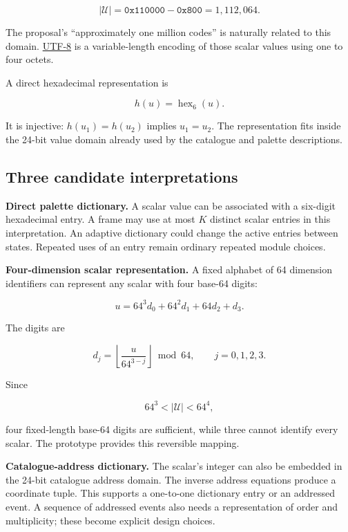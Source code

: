 \documentclass[
  11pt,
  a4paper,
]{article}
\begin{document}
\[
|\mathcal U|=
\mathtt{0x110000}-\mathtt{0x800}
=1{,}112{,}064.
\]

The proposal's ``approximately one million codes'' is naturally related
to this domain.
\href{https://www.rfc-editor.org/rfc/rfc3629.html}{UTF-8} is a
variable-length encoding of those scalar values using one to four
octets.

A direct hexadecimal representation is

\[
h(u)=\operatorname{hex}_6(u).
\]

It is injective: \(h(u_1)=h(u_2)\) implies \(u_1=u_2\). The
representation fits inside the 24-bit value domain already used by the
catalogue and palette descriptions.

\hypertarget{three-candidate-interpretations}{%
\subsection{Three candidate
interpretations}\label{three-candidate-interpretations}}

\textbf{Direct palette dictionary.} A scalar value can be associated
with a six-digit hexadecimal entry. A frame may use at most \(K\)
distinct scalar entries in this interpretation. An adaptive dictionary
could change the active entries between states. Repeated uses of an
entry remain ordinary repeated module choices.

\textbf{Four-dimension scalar representation.} A fixed alphabet of 64
dimension identifiers can represent any scalar with four base-64 digits:

\[
u=64^3d_0+64^2d_1+64d_2+d_3.
\]

The digits are

\[
d_j=
\left\lfloor\frac{u}{64^{3-j}}\right\rfloor\bmod64,
\qquad j=0,1,2,3.
\]

Since

\[
64^3<|\mathcal U|<64^4,
\]

four fixed-length base-64 digits are sufficient, while three cannot
identify every scalar. The prototype provides this reversible mapping.

\textbf{Catalogue-address dictionary.} The scalar's integer can also be
embedded in the 24-bit catalogue address domain. The inverse address
equations produce a coordinate tuple. This supports a one-to-one
dictionary entry or an addressed event. A sequence of addressed events
also needs a representation of order and multiplicity; these become
explicit design choices.
\end{document}
